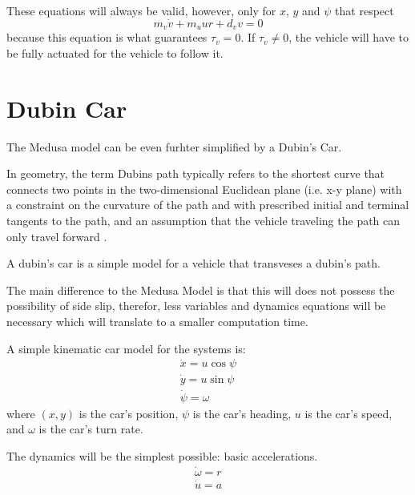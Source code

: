 \par These equations will always be valid, however, only for $x$, $y$ and $\psi$ that respect
\begin{equation}
    m_v \dot{v} + m_u u r + d_v v = 0
    \label{eq:onlymandatoryconstraint}
\end{equation}
because this equation is what guarantees $\tau_v = 0$. If $\tau_v \neq 0$, the vehicle will have to be fully actuated for the vehicle to follow it.



\section{Dubin Car}
\label{sec:dubincarequations}

\par The Medusa model can be even furhter simplified by a Dubin's Car.
\par In geometry, the term Dubins path typically refers to the shortest curve that connects two points in the two-dimensional Euclidean plane (i.e. x-y plane) with a constraint on the curvature of the path and with prescribed initial and terminal tangents to the path, and an assumption that the vehicle traveling the path can only travel forward \cite{wiki:dubincar}. 
\par A dubin's car is a simple model for a vehicle that transveses a dubin's path.
\par The main difference to the Medusa Model is that this will does not possess the possibility of side slip, therefor, less variables and dynamics equations will be necessary which will translate to a smaller computation time.

\par A simple kinematic car model for the systems is: 
\begin{equation}
    \begin{gathered}
        \dot{x} = u \cos \psi \\
        \dot{y} = u \sin \psi \\
        \dot{\psi} = \omega
    \end{gathered}
\end{equation}
where $(x,y)$ is the car's position, $\psi$ is the car's heading, $u$ is the car's speed, and $\omega$ is the car's turn rate.

\par The dynamics will be the simplest possible: basic accelerations.
\begin{equation}
    \begin{gathered}
        \dot{\omega} = r \\
        \dot{u} = a
    \end{gathered}
\end{equation}

